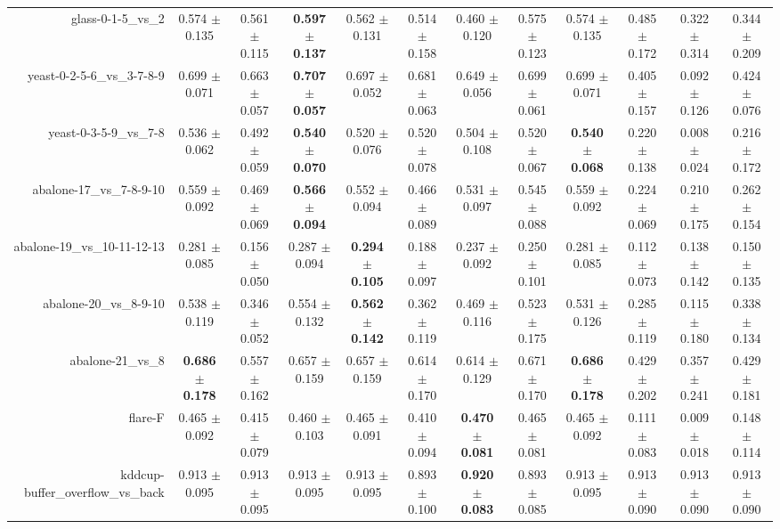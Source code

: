 \begin{table}[!ht]
{\begin{tabular}{r c c c c c c c c c c c}
glass-0-1-5\_vs\_2 & 0.574 $\pm$ 0.135 & 0.561 $\pm$ 0.115 & \textbf{0.597 $\pm$ 0.137} & 0.562 $\pm$ 0.131 & 0.514 $\pm$ 0.158 & 0.460 $\pm$ 0.120 & 0.575 $\pm$ 0.123 & 0.574 $\pm$ 0.135 & 0.485 $\pm$ 0.172 & 0.322 $\pm$ 0.314 & 0.344 $\pm$ 0.209 \\
yeast-0-2-5-6\_vs\_3-7-8-9 & 0.699 $\pm$ 0.071 & 0.663 $\pm$ 0.057 & \textbf{0.707 $\pm$ 0.057} & 0.697 $\pm$ 0.052 & 0.681 $\pm$ 0.063 & 0.649 $\pm$ 0.056 & 0.699 $\pm$ 0.061 & 0.699 $\pm$ 0.071 & 0.405 $\pm$ 0.157 & 0.092 $\pm$ 0.126 & 0.424 $\pm$ 0.076 \\
yeast-0-3-5-9\_vs\_7-8 & 0.536 $\pm$ 0.062 & 0.492 $\pm$ 0.059 & \textbf{0.540 $\pm$ 0.070} & 0.520 $\pm$ 0.076 & 0.520 $\pm$ 0.078 & 0.504 $\pm$ 0.108 & 0.520 $\pm$ 0.067 & \textbf{0.540 $\pm$ 0.068} & 0.220 $\pm$ 0.138 & 0.008 $\pm$ 0.024 & 0.216 $\pm$ 0.172 \\
abalone-17\_vs\_7-8-9-10 & 0.559 $\pm$ 0.092 & 0.469 $\pm$ 0.069 & \textbf{0.566 $\pm$ 0.094} & 0.552 $\pm$ 0.094 & 0.466 $\pm$ 0.089 & 0.531 $\pm$ 0.097 & 0.545 $\pm$ 0.088 & 0.559 $\pm$ 0.092 & 0.224 $\pm$ 0.069 & 0.210 $\pm$ 0.175 & 0.262 $\pm$ 0.154 \\
abalone-19\_vs\_10-11-12-13 & 0.281 $\pm$ 0.085 & 0.156 $\pm$ 0.050 & 0.287 $\pm$ 0.094 & \textbf{0.294 $\pm$ 0.105} & 0.188 $\pm$ 0.097 & 0.237 $\pm$ 0.092 & 0.250 $\pm$ 0.101 & 0.281 $\pm$ 0.085 & 0.112 $\pm$ 0.073 & 0.138 $\pm$ 0.142 & 0.150 $\pm$ 0.135 \\
abalone-20\_vs\_8-9-10 & 0.538 $\pm$ 0.119 & 0.346 $\pm$ 0.052 & 0.554 $\pm$ 0.132 & \textbf{0.562 $\pm$ 0.142} & 0.362 $\pm$ 0.119 & 0.469 $\pm$ 0.116 & 0.523 $\pm$ 0.175 & 0.531 $\pm$ 0.126 & 0.285 $\pm$ 0.119 & 0.115 $\pm$ 0.180 & 0.338 $\pm$ 0.134 \\
abalone-21\_vs\_8 & \textbf{0.686 $\pm$ 0.178} & 0.557 $\pm$ 0.162 & 0.657 $\pm$ 0.159 & 0.657 $\pm$ 0.159 & 0.614 $\pm$ 0.170 & 0.614 $\pm$ 0.129 & 0.671 $\pm$ 0.170 & \textbf{0.686 $\pm$ 0.178} & 0.429 $\pm$ 0.202 & 0.357 $\pm$ 0.241 & 0.429 $\pm$ 0.181 \\
flare-F & 0.465 $\pm$ 0.092 & 0.415 $\pm$ 0.079 & 0.460 $\pm$ 0.103 & 0.465 $\pm$ 0.091 & 0.410 $\pm$ 0.094 & \textbf{0.470 $\pm$ 0.081} & 0.465 $\pm$ 0.081 & 0.465 $\pm$ 0.092 & 0.111 $\pm$ 0.083 & 0.009 $\pm$ 0.018 & 0.148 $\pm$ 0.114 \\
kddcup-buffer\_overflow\_vs\_back & 0.913 $\pm$ 0.095 & 0.913 $\pm$ 0.095 & 0.913 $\pm$ 0.095 & 0.913 $\pm$ 0.095 & 0.893 $\pm$ 0.100 & \textbf{0.920 $\pm$ 0.083} & 0.893 $\pm$ 0.085 & 0.913 $\pm$ 0.095 & 0.913 $\pm$ 0.090 & 0.913 $\pm$ 0.090 & 0.913 $\pm$ 0.090 \\

\end{tabular}}
\end{table}
